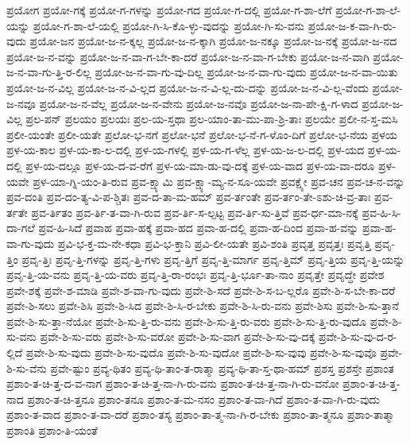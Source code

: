 {ಪ್ರಯೋಗ
ಪ್ರಯೋ-ಗಕ್ಕೆ
ಪ್ರಯೋ-ಗ-ಗಳನ್ನು
ಪ್ರಯೋ-ಗದ
ಪ್ರಯೋ-ಗ-ದಲ್ಲಿ
ಪ್ರಯೋ-ಗ-ಶಾ-ಲೆಗೆ
ಪ್ರಯೋ-ಗ-ಶಾ-ಲೆ-ಯನ್ನು
ಪ್ರಯೋ-ಗ-ಶಾ-ಲೆ-ಯಲ್ಲಿ
ಪ್ರಯೋ-ಗಿ-ಸಿ-ಕೊ-ಳ್ಳು-ವುದನ್ನು
ಪ್ರಯೋ-ಗಿ-ಸು-ವನು
ಪ್ರಯೋ-ಜ-ಕ-ವಾ-ಗಿ-ರು-ವುದು
ಪ್ರಯೋ-ಜನ
ಪ್ರಯೋ-ಜ-ನ-ಕ್ಕಲ್ಲ
ಪ್ರಯೋ-ಜ-ನ-ಕ್ಕಾಗಿ
ಪ್ರಯೋ-ಜ-ನಕ್ಕೂ
ಪ್ರಯೋ-ಜ-ನಕ್ಕೆ
ಪ್ರಯೋ-ಜ-ನದ
ಪ್ರಯೋ-ಜ-ನ-ವನ್ನು
ಪ್ರಯೋ-ಜ-ನ-ವಾ-ಗ-ಬೇ-ಕಾ-ದರೆ
ಪ್ರಯೋ-ಜ-ನ-ವಾ-ಗ-ಬೇಕು
ಪ್ರಯೋ-ಜ-ನ-ವಾಗಿ
ಪ್ರಯೋ-ಜ-ನ-ವಾ-ಗು-ತ್ತಿ-ರ-ಲಿಲ್ಲ
ಪ್ರಯೋ-ಜ-ನ-ವಾ-ಗು-ವು-ದಿಲ್ಲ
ಪ್ರಯೋ-ಜ-ನ-ವಾ-ಗು-ವುದು
ಪ್ರಯೋ-ಜ-ನ-ವಾ-ಯಿತು
ಪ್ರಯೋ-ಜ-ನ-ವಿಲ್ಲ
ಪ್ರಯೋ-ಜ-ನ-ವಿ-ಲ್ಲದ
ಪ್ರಯೋ-ಜ-ನ-ವಿ-ಲ್ಲ-ದು-ದನ್ನು
ಪ್ರಯೋ-ಜ-ನ-ವಿ-ಲ್ಲ-ವೆಂದು
ಪ್ರಯೋ-ಜ-ನವೂ
ಪ್ರಯೋ-ಜ-ನ-ವೆಲ್ಲ
ಪ್ರಯೋ-ಜ-ನ-ವೇನು
ಪ್ರಯೋ-ಜ-ನವೊ
ಪ್ರಯೋ-ಜ-ನಾ-ಪೇ-ಕ್ಷಿ-ಗ-ಳಾದ
ಪ್ರಯೋ-ಜ-ವಿಲ್ಲ
ಪ್ರಲ-ಪನ್
ಪ್ರಲಯಂ
ಪ್ರಲಯಃ
ಪ್ರಲ-ಯ-ಸ್ತಥಾ
ಪ್ರಲ-ಯಾಂ-ತಾ-ಮು-ಪಾ-ಶ್ರಿ-ತಾಃ
ಪ್ರಲಯೇ
ಪ್ರಲೀ-ನ-ಸ್ತ-ಮಸಿ
ಪ್ರಲೀ-ಯಂತೇ
ಪ್ರಲೀ-ಯತೇ
ಪ್ರಲೋ-ಭ-ನಗೆ
ಪ್ರಲೋ-ಭನೆ
ಪ್ರಲೋ-ಭ-ನೆ-ಗ-ಳೊಂ-ದಿಗೆ
ಪ್ರಲೋ-ಭ-ನೆಯ
ಪ್ರಳಯ
ಪ್ರಳ-ಯ-ಕಾಲ
ಪ್ರಳ-ಯ-ಕಾ-ಲ-ದಲ್ಲಿ
ಪ್ರಳ-ಯ-ಗಳಲ್ಲಿ
ಪ್ರಳ-ಯ-ಗ-ಳೆಲ್ಲ
ಪ್ರಳ-ಯ-ಜ-ಲ-ದಲ್ಲಿ
ಪ್ರಳ-ಯದ
ಪ್ರಳ-ಯ-ದಲ್ಲಿ
ಪ್ರಳ-ಯ-ದಲ್ಲೂ
ಪ್ರಳ-ಯ-ದ-ವ-ರೆಗೆ
ಪ್ರಳ-ಯ-ಮಾ-ಡು-ವು-ದಕ್ಕೆ
ಪ್ರಳ-ಯ-ವಾದ
ಪ್ರಳ-ಯ-ವಾ-ದರೂ
ಪ್ರಳ-ಯವೇ
ಪ್ರಳ-ಯಾ-ಗ್ನಿ-ಯಂ-ತಿ-ರುವ
ಪ್ರವ-ಕ್ಷ್ಯಾಮಿ
ಪ್ರವ-ಕ್ಷ್ಯಾ-ಮ್ಯ-ನ-ಸೂ-ಯವೇ
ಪ್ರವಕ್ಷ್ಯೇ
ಪ್ರವ-ಚನ
ಪ್ರವ-ಚ-ನ-ವನ್ನು
ಪ್ರವ-ದಂತಿ
ಪ್ರವ-ದಂ-ತ್ಯ-ವಿ-ಪ-ಶ್ಚಿತಃ
ಪ್ರವ-ದ-ತಾ-ಮ-ಹಮ್
ಪ್ರವ-ರ್ತಂತೇ
ಪ್ರವ-ರ್ತಂ-ತೇ-ಽಶು-ಚಿ-ವ್ರ-ತಾಃ
ಪ್ರವ-ರ್ತತೇ
ಪ್ರವ-ರ್ತಿತಂ
ಪ್ರವ-ರ್ತಿ-ತ-ವಾ-ಗಿ-ರುವ
ಪ್ರವ-ರ್ತಿ-ಸ-ಲ್ಪಟ್ಟ
ಪ್ರವ-ರ್ತಿ-ಸು-ತ್ತಿವೆ
ಪ್ರವ-ರ್ಧ-ಮಾ-ನಕ್ಕೆ
ಪ್ರವ-ಹಿ-ಸಿ-ದಾ-ಗಲೆ
ಪ್ರವ-ಹಿ-ಸಿದೆ
ಪ್ರವಾಹ
ಪ್ರವಾ-ಹಕ್ಕೆ
ಪ್ರವಾ-ಹದ
ಪ್ರವಾ-ಹ-ದಲ್ಲಿ
ಪ್ರವಾ-ಹ-ದಿಂದ
ಪ್ರವಾ-ಹ-ವನ್ನು
ಪ್ರವಾ-ಹ-ವಾ-ಗು-ವುದು
ಪ್ರವಿ-ಭ-ಕ್ತ-ಮ-ನೇ-ಕಧಾ
ಪ್ರವಿ-ಭ-ಕ್ತಾನಿ
ಪ್ರವಿ-ಲೀ-ಯತೇ
ಪ್ರವಿ-ಶಂತಿ
ಪ್ರವೃತ್ತ
ಪ್ರವೃತ್ತಃ
ಪ್ರವೃತ್ತಿ
ಪ್ರವೃ-ತ್ತಿಂ
ಪ್ರವೃ-ತ್ತಿಃ
ಪ್ರವೃ-ತ್ತಿ-ಗಳನ್ನು
ಪ್ರವೃ-ತ್ತಿ-ಗಳು
ಪ್ರವೃ-ತ್ತಿಗೆ
ಪ್ರವೃ-ತ್ತಿ-ಮಾರ್ಗ
ಪ್ರವೃ-ತ್ತಿಮ್
ಪ್ರವೃ-ತ್ತಿಯ
ಪ್ರವೃ-ತ್ತಿ-ಯನ್ನು
ಪ್ರವೃ-ತ್ತಿ-ಯ-ವನು
ಪ್ರವೃ-ತ್ತಿ-ಯ-ವರು
ಪ್ರವೃ-ತ್ತಿ-ರಾ-ರಂಭಃ
ಪ್ರವೃ-ತ್ತಿ-ರ್ಭೂ-ತಾ-ನಾಂ
ಪ್ರವೃತ್ತೇ
ಪ್ರವೃದ್ಧೇ
ಪ್ರವೇಶ
ಪ್ರವೇ-ಶಕ್ಕೆ
ಪ್ರವೇ-ಶ-ಮಾಡಿ
ಪ್ರವೇ-ಶ-ವಾ-ಗು-ವುದು
ಪ್ರವೇ-ಶಿ-ಸದೆ
ಪ್ರವೇ-ಶಿ-ಸ-ಬ-ಲ್ಲರೊ
ಪ್ರವೇ-ಶಿ-ಸ-ಬೇ-ಕಾ-ದರೆ
ಪ್ರವೇ-ಶಿ-ಸಲು
ಪ್ರವೇ-ಶಿಸಿ
ಪ್ರವೇ-ಶಿ-ಸಿದ
ಪ್ರವೇ-ಶಿ-ಸಿ-ರ-ಬೇಕು
ಪ್ರವೇ-ಶಿ-ಸಿ-ರು-ವನು
ಪ್ರವೇ-ಶಿಸು
ಪ್ರವೇ-ಶಿ-ಸು-ತ್ತಾನೆ
ಪ್ರವೇ-ಶಿ-ಸು-ತ್ತಾ-ನೆಯೋ
ಪ್ರವೇ-ಶಿ-ಸು-ತ್ತಿ-ರು-ವನು
ಪ್ರವೇ-ಶಿ-ಸು-ತ್ತಿ-ರು-ವರು
ಪ್ರವೇ-ಶಿ-ಸು-ತ್ತಿ-ರು-ವುದೊ
ಪ್ರವೇ-ಶಿ-ಸು-ವನು
ಪ್ರವೇ-ಶಿ-ಸು-ವರು
ಪ್ರವೇ-ಶಿ-ಸು-ವರೋ
ಪ್ರವೇ-ಶಿ-ಸು-ವಾಗ
ಪ್ರವೇ-ಶಿ-ಸು-ವು-ದಕ್ಕೆ
ಪ್ರವೇ-ಶಿ-ಸು-ವು-ದ-ರ-ಲ್ಲಿದೆ
ಪ್ರವೇ-ಶಿ-ಸು-ವುದು
ಪ್ರವೇ-ಶಿ-ಸು-ವುದೊ
ಪ್ರವೇ-ಶಿ-ಸು-ವುದೋ
ಪ್ರವೇ-ಶಿ-ಸು-ವುವು
ಪ್ರವೇ-ಶಿ-ಸು-ವುವೊ
ಪ್ರವೇ-ಶಿ-ಸು-ವೆನು
ಪ್ರವೇ-ಷ್ಟುಂ
ಪ್ರವ್ಯ-ಥಿತಂ
ಪ್ರವ್ಯ-ಥಿ-ತಾಂ-ತ-ರಾತ್ಮಾ
ಪ್ರವ್ಯ-ಥಿ-ತಾ-ಸ್ತ-ಥಾ-ಹಮ್
ಪ್ರಶಸ್ತ
ಪ್ರಶಸ್ತೇ
ಪ್ರಶಾಂತ
ಪ್ರಶಾಂ-ತ-ಚಿ-ತ್ತ-ದ-ವ-ನಾಗ
ಪ್ರಶಾಂ-ತ-ಚಿ-ತ್ತ-ನಾ-ಗಿ-ರು-ವನು
ಪ್ರಶಾಂ-ತ-ಚಿ-ತ್ತ-ನಾ-ಗಿ-ರು-ವನೋ
ಪ್ರಶಾಂ-ತ-ಚಿ-ತ್ತ-ನಾದ
ಪ್ರಶಾಂ-ತ-ಚಿ-ತ್ತನೂ
ಪ್ರಶಾಂ-ತನೂ
ಪ್ರಶಾಂ-ತ-ಮ-ನಸಂ
ಪ್ರಶಾಂ-ತ-ವಾ-ಗಿದೆ
ಪ್ರಶಾಂ-ತ-ವಾ-ಗಿ-ರು-ವುದು
ಪ್ರಶಾಂ-ತ-ವಾದ
ಪ್ರಶಾಂ-ತ-ವಾ-ದರೆ
ಪ್ರಶಾಂ-ತಸ್ಯ
ಪ್ರಶಾಂ-ತಾ-ತ್ಮ-ನಾ-ಗಿ-ರ-ಬೇಕು
ಪ್ರಶಾಂ-ತಾ-ತ್ಮನೂ
ಪ್ರಶಾಂ-ತಾತ್ಮಾ
ಪ್ರಶಾಂತಿ
ಪ್ರಶಾಂ-ತಿ-ಯಂತೆ
}
